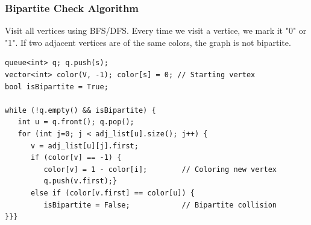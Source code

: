 \begin{frame}[fragile]
  \frametitle{Bipartite Check Algorithm}
  Visit all vertices using BFS/DFS. Every time we visit a vertice, we mark it "0" or "1". If two adjacent vertices are of the same colors, the graph is not bipartite.

  {\smaller
  \begin{exampleblock}{}
\begin{verbatim}
queue<int> q; q.push(s);
vector<int> color(V, -1); color[s] = 0; // Starting vertex
bool isBipartite = True;

while (!q.empty() && isBipartite) {
   int u = q.front(); q.pop();
   for (int j=0; j < adj_list[u].size(); j++) {
      v = adj_list[u][j].first;
      if (color[v] == -1) {
         color[v] = 1 - color[i];        // Coloring new vertex
         q.push(v.first);}
      else if (color[v.first] == color[u]) {
         isBipartite = False;            // Bipartite collision
}}}
\end{verbatim}
  \end{exampleblock}
  }
\end{frame}

